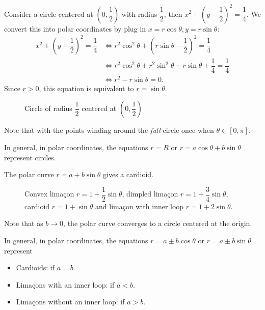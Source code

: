 \begin{ex}
    Consider a circle centered at $(0, \dfrac{1}{2})$ with radius $\dfrac{1}{2}$, then $x^2+(y-\dfrac{1}{2})^2 = \dfrac{1}{4}$.
    We convert this into polar coordinates by plug in $x = r \cos\theta, y = r \sin\theta$:
    \begin{align*}
        x^2+(y-\dfrac{1}{2})^2 = \dfrac{1}{4} &\iff r^2 \cos^2\theta +(r \sin \theta-\dfrac{1}{2})^2 = \dfrac{1}{4}\\
        &\iff r^2 \cos^2\theta + r^2 \sin^2 \theta - r \sin \theta + \dfrac{1}{4} = \dfrac{1}{4}\\
        &\iff r^2 - r \sin \theta = 0.
    \end{align*}
    Since $r > 0$, this equation is equivalent to $r = \sin \theta$.

    \begin{figure}[H]
        \centering
        \resizebox{0.6\textwidth}{!}{} %
        \caption{Circle of radius $\dfrac{1}{2}$ centered at $(0,\dfrac{1}{2})$}
        \label{fig:circle shifted}
    \end{figure}

    Note that with the points winding around the \textit{full} circle once when $\theta \in [0,\pi]$.
\end{ex}

In general, in polar coordinates, the equations $r=R$ or $r=a\cos\theta+b\sin\theta$ represent circles.

\begin{ex}[$r=a+b\sin \theta$]
    The polar curve $r = a+b\sin \theta$ gives a cardioid.
    \begin{figure}[H]
        \centering
        \resizebox{\textwidth}{!}{} %
        \caption{Convex lima\c{c}on $r=1+\dfrac{1}{2}\sin\theta$, dimpled lima\c{c}on $r=1+\dfrac{3}{4}\sin\theta$, cardioid $r=1+\sin\theta$ and lima\c{c}on with inner loop $r=1+2\sin\theta$.}
        \label{fig:cardioid}
    \end{figure}
\end{ex}
Note that as $b\to 0$, the polar curve converges to a circle centered at the origin.

In general, in polar coordinates, the equations $r=a\pm b\cos\theta$ or $r=a\pm b\sin\theta$ represent 
\begin{itemize}
    \item Cardioids: if $a=b$.
    \item Lima\c{c}ons with an inner loop: if $a<b$.
    \item Lima\c{c}ons without an inner loop: if $a>b$.
\end{itemize}


